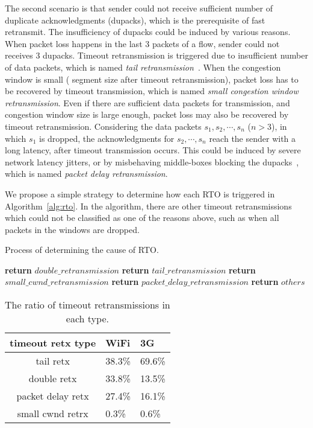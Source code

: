 The second scenario is that sender could not receive sufficient number of duplicate acknowledgments (dupacks), which is the prerequisite of fast retransmit. The insufficiency of dupacks could be induced by various reasons. When packet loss happens in the last 3 packets of a flow, sender could not receives 3 dupacks. Timeout retransmission is triggered due to insufficient number of data packets, which is named \emph{tail retransmission}~\cite{flach2013reducing}. When the congestion window is small ( segment size after timeout retransmission), packet loss has to be recovered by timeout transmission, which is named \emph{small congestion window retransmission}. Even if there are sufficient data packets for transmission, and congestion window size is large enough, packet loss may also be recovered by timeout retransmission. Considering the data packets $s_1, s_2, \cdots, s_n$ ($n > 3$), in which $s_1$ is dropped, the acknowledgments for $s_2, \cdots, s_n$ reach the sender with a long latency, after timeout transmission occurs. This could be induced by severe network latency jitters, or by misbehaving middle-boxes blocking the dupacks~\cite{honda2011isit}, which is named \emph{packet delay retransmission}.

We propose a simple strategy to determine how each RTO is triggered in Algorithm~\ref{alg:rto}. In the algorithm, there are other timeout retransmissions which could not be classified as one of the reasons above, such as when all packets in the windows are dropped. 

\begin{algorithm}
	\caption{Process of determining the cause of RTO.}
	\label{alg:rto}
	\begin{algorithmic}[1]
				\State \textbf{return} $double\_retransmission$
				\State \textbf{return} $tail\_retransmission$
				\State \textbf{return} $small\_cwnd\_retransmission$
				\State \textbf{return} $packet\_delay\_retransmission$
			\Else
				\State \textbf{return} $others$
			\EndIf
		\EndProcedure
	\end{algorithmic}
\end{algorithm}

\begin{table}[th]
\caption{The ratio of timeout retransmissions in each type.}
\label{tab:rto_type}
\centering
\renewcommand{\arraystretch}{1.0}
\begin{tabular}{c|C{1.1cm}|C{1.1cm}}
	\hline
	\textbf{timeout retx type} & WiFi & 3G \\
	\hline
	tail retx & 38.3\% & 69.6\% \\
	\hline
	double retx & 33.8\% & 13.5\% \\
	\hline
	packet delay retx & 27.4\% & 16.1\% \\
	\hline
	small cwnd retrx & 0.3\% & 0.6\% \\
	\hline
\end{tabular}
\end{table}

